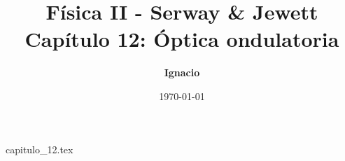 \documentclass[11pt,spanish,oneside]{report}
\title{\textbf{Física II - Serway \& Jewett} \\ \Large Capítulo 12: Óptica ondulatoria}
\author{\textbf{Ignacio}}
\date{\today}
\begin{document}
\maketitle

{capitulo_12.tex}
\end{document}
